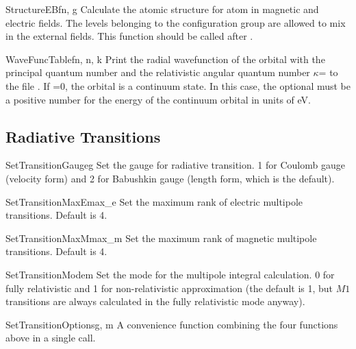 \begin{fundesc}{StructureEB}{fn, g}
Calculate the atomic structure for atom in magnetic and electric fields. The
levels belonging to the configuration group  are allowed to mix in the
external fields. This function should be called after .
\end{fundesc}

\begin{fundesc}{WaveFuncTable}{fn, n, k}
Print the radial wavefunction of the orbital with the principal quantum number
 and the relativistic angular quantum number $\kappa$= to the file
. If =0, the orbital is a continuum state. In this case, the
optional  must be a positive number for the energy of the continuum
orbital in units of eV.
\end{fundesc}


\subsection{Radiative Transitions}

\begin{fundesc}{SetTransitionGauge}{g}
Set the gauge for radiative transition. 1 for Coulomb gauge (velocity form) and
2 for Babushkin gauge (length form, which is the default). 
\end{fundesc}

\begin{fundesc}{SetTransitionMaxE}{max\_e}
Set the maximum rank of electric multipole transitions. Default is 4.
\end{fundesc}

\begin{fundesc}{SetTransitionMaxM}{max\_m}
Set the maximum rank of magnetic multipole transitions. Default is 4.
\end{fundesc}

\begin{fundesc}{SetTransitionMode}{m}
Set the mode for the multipole integral calculation. 0 for fully relativistic
and 1 for non-relativistic approximation (the default is 1, but $M1$ transitions
are always calculated in the fully relativistic mode anyway).
\end{fundesc}

\begin{fundesc}{SetTransitionOptions}{g, m}
A convenience function combining the four functions above in a single call.
\end{fundesc}

